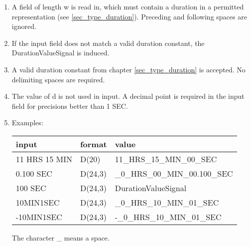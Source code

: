 \begin{enumerate}
\begin{enumerate}
\item A field of length w is read in, which must contain a duration in a
permitted representation (see \ref{sec_type_duration}).
 Preceding and following spaces are
ignored.

\item If the input field does not match a valid duration constant, the 
   DurationValueSignal is induced.

\item A valid duration constant from chapter \ref{sec_type_duration} is accepted.
No delimiting spaces are required.
\item The value of d is not used in input. A decimal point is required in the
input field for precisions better than 1 SEC.

\item Examples:

\begin{tabular}{lll}
input               & format  & value \\ \hline
11 HRS 15 MIN & D(20)   & 11\_HRS\_15\_MIN\_00\_SEC \\
0.100 SEC    & D(24,3) & \_0\_HRS\_00\_MIN\_00.100\_SEC \\
100 SEC    & D(24,3) & DurationValueSignal \\
10MIN1SEC    & D(24,3) & \_0\_HRS\_10\_MIN\_01\_SEC \\
-10MIN1SEC    & D(24,3) & -\_0\_HRS\_10\_MIN\_01\_SEC \\
\end{tabular}

The character \_ means a space.

\end{enumerate}
\end{enumerate}



